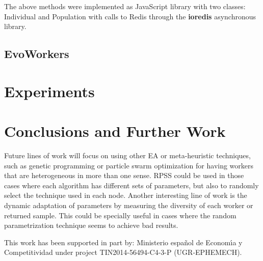 The above methods were implemented as JavaScript library with two classes: Individual and Population with 
calls to Redis through the {\bf ioredis} asynchronous library.  



\subsection{EvoWorkers}
\label{sec:evoworkers}


\section{Experiments}
 \label{sec:experiments}



\section{Conclusions and Further Work}
\label{sec:conclusions}


Future lines of work will focus on using other EA or meta-heuristic techniques, 
such as genetic programming or particle swarm optimization for having 
workers that are heterogeneous in more than one sense. RPSS could be
used in those cases where each algorithm has different sets of
parameters, but also to randomly select the technique used in each
node. Another interesting line of work is the dynamic adaptation of
parameters by measuring the diversity of each worker or returned
sample. This could be specially useful in cases where the random
parametrization technique seems to achieve bad results. 

\begin{acks}
This work has been supported in part by:  Ministerio espa\~{n}ol de
Econom\'{\i}a y Competitividad under project TIN2014-56494-C4-3-P
(UGR-EPHEMECH).
\end{acks}
